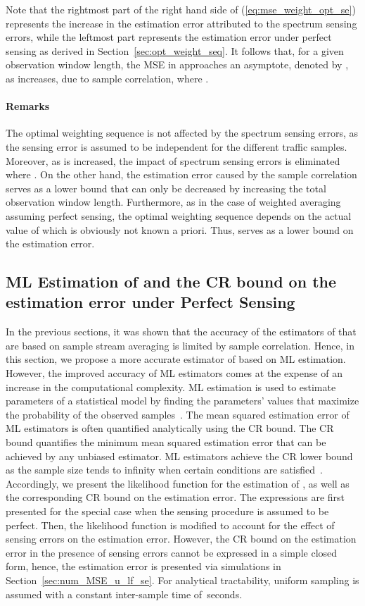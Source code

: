 \documentclass[11pt,draftclsnofoot,journal,onecolumn]{IEEEtran}
\begin{document}
Note that the rightmost part of the right hand side of (\ref{eq:mse_weight_opt_se}) represents the increase in the estimation error attributed to the spectrum sensing errors, while the leftmost part represents the estimation error under perfect sensing as derived in Section~\ref{sec:opt_weight_seq}. It follows that, for a given observation window length, the MSE in  approaches an asymptote, denoted by , as  increases, due to sample correlation, where .

\paragraph*{Remarks}

The optimal weighting sequence is not affected by the spectrum sensing errors, as the sensing error is assumed to be independent for the different traffic samples. Moreover, as  is increased, the impact of spectrum sensing errors is eliminated where . On the other hand, the estimation error caused by the sample correlation serves as a lower bound that can only be decreased by increasing the total observation window length. Furthermore, as in the case of weighted averaging assuming perfect sensing, the optimal weighting sequence depends on the actual value of  which is obviously not known a priori. Thus,  serves as a lower bound on the estimation error.

\subsection{ML Estimation of  and the CR bound on the estimation error under Perfect Sensing}
\label{sec:ml_u}

In the previous sections, it was shown that the accuracy of the estimators of  that are based on sample stream averaging is limited by sample correlation. Hence, in this section, we propose a more accurate estimator of  based on ML estimation. However, the improved accuracy of ML estimators comes at the expense of an increase in the computational complexity. ML estimation is used to estimate parameters of a statistical model by finding the parameters' values that maximize the probability of the observed samples~\cite{raol_book_2004}. The mean squared estimation error of ML estimators is often quantified analytically using the CR bound. The CR bound quantifies the minimum mean squared estimation error that can be achieved by any unbiased estimator. ML estimators achieve the CR lower bound as the sample size tends to infinity when certain conditions are satisfied~\cite[Ch. 12]{ML_ref}. Accordingly, we present the likelihood function for the estimation of , as well as the corresponding CR bound on the estimation error. The expressions are first presented for the special case when the sensing procedure is assumed to be perfect. Then, the likelihood function is modified to account for the effect of sensing errors on the estimation error. However, the CR bound on the estimation error in the presence of sensing errors cannot be expressed in a simple closed form, hence, the estimation error is presented via simulations in Section~\ref{sec:num_MSE_u_lf_se}. For analytical tractability, uniform sampling is assumed with a constant inter-sample time of \,seconds.
\end{document}
